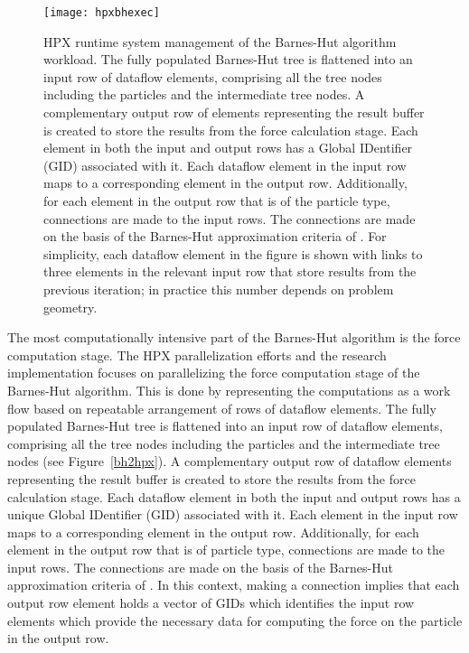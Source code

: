 \documentclass[floatfix]{revtex4}
\begin{document}
\begin{figure}[htp]
\centering
\texttt{[image: hpxbhexec]}
\caption{HPX runtime system management of the Barnes-Hut algorithm workload.
The fully populated Barnes-Hut tree is flattened into an input row of 
dataflow elements, comprising all the tree nodes including the particles and the
intermediate tree nodes. A complementary output row of elements representing the result buffer is created to store
the results from the force calculation stage. Each element in both the input and output rows has a Global IDentifier (GID) associated
with it. Each dataflow element in the input row maps to a corresponding
element in the output row. Additionally, for each element in the output 
row that is of the particle type, connections are made to the input rows.
The connections are made on the basis of the Barnes-Hut approximation criteria of .
For simplicity, each dataflow element in the figure is shown with links to 
three elements in the relevant input row that store results from the previous 
iteration; in practice this number depends on problem geometry.}
\label{fig:hpxbhexec}
\end{figure}

The most computationally intensive part of the Barnes-Hut algorithm is the force computation stage. 
The HPX parallelization
efforts and the research implementation focuses on parallelizing the force 
computation stage of the Barnes-Hut algorithm.
This is done by representing the computations as a work flow based on 
repeatable arrangement of rows of dataflow elements. The fully populated
Barnes-Hut tree is flattened into an input row of dataflow elements, 
comprising all the tree nodes including the particles and the
intermediate tree nodes (see Figure~\ref{bh2hpx}). 
A complementary output row of dataflow elements representing the result buffer is 
created to store the results from the force calculation stage. 
Each dataflow element in both the input and output rows 
has a unique Global IDentifier (GID) associated
with it. Each element in the input row maps to a corresponding element in 
the output row. 
Additionally, for each element in the output row
that is of particle type, connections are made to the input rows.
The connections are made on the basis of the Barnes-Hut approximation criteria of . In this context, making a
connection implies that each output row element holds a vector of GIDs 
which identifies the input row elements which provide
the necessary data for computing the force on the particle in the output row.
\end{document}

